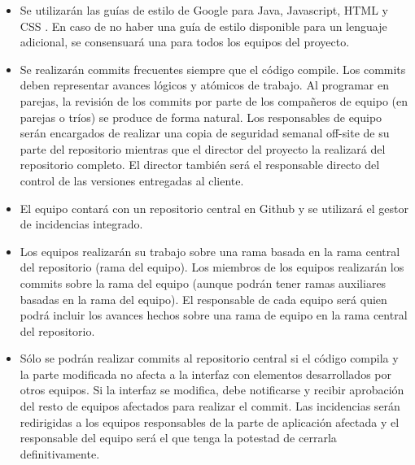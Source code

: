 \begin{itemize}
		\item Se utilizarán las guías de estilo de Google para Java, Javascript, HTML y CSS \cite{googleguide}. En caso de no haber una guía de estilo disponible para un lenguaje adicional, se consensuará una para todos los equipos del proyecto.

    \item{Se realizarán commits frecuentes siempre que el código compile. Los commits deben representar avances lógicos y atómicos de trabajo. Al programar en parejas, la revisión de los commits por parte de los compañeros de equipo (en parejas o tríos) se produce de forma natural. Los responsables de equipo serán encargados de realizar una copia de seguridad semanal off-site de su parte del repositorio mientras que el director del proyecto la realizará del repositorio completo. El director también será el responsable directo del control de las versiones entregadas al cliente. }
    \item{El equipo contará con un repositorio central en Github y se utilizará el gestor de incidencias integrado.}
		\item Los equipos realizarán su trabajo sobre una rama basada en la rama central del repositorio (rama del equipo). Los miembros de los equipos realizarán los commits sobre la rama del equipo (aunque podrán tener ramas auxiliares basadas en la rama del equipo). El responsable de cada equipo será quien podrá incluir los avances hechos sobre una rama de equipo en la rama central del repositorio.
    \item{Sólo se podrán realizar commits al repositorio central si el código compila y la parte modificada no afecta a la interfaz con elementos desarrollados por otros equipos. Si la interfaz se modifica, debe notificarse y recibir aprobación del resto de equipos afectados para realizar el commit. Las incidencias serán redirigidas a los equipos responsables de la parte de aplicación afectada y el responsable del equipo será el que tenga la potestad de cerrarla definitivamente.}
\end{itemize}
